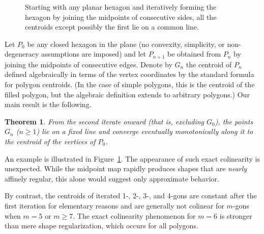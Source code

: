 \documentclass{amsart}
\newtheorem{theorem}{Theorem}
\theoremstyle{definition}
\begin{document}
\begin{figure}[ht]
    \caption{Starting with any planar hexagon and iteratively forming the hexagon by joining the midpoints of consecutive sides, all the centroids except possibly the first lie on a common line.}
    \label{fig:example}
\end{figure}

Let $P_0$ be any closed hexagon in the plane (no convexity, simplicity, or non-degeneracy assumptions are imposed) and let $P_{n+1}$ be obtained from $P_n$ by joining the midpoints of consecutive edges. Denote by $G_n$ the centroid of $P_n$ defined algebraically in terms of the vertex coordinates by the standard formula for polygon centroids. (In the case of simple polygons, this is the centroid of the filled polygon, but the algebraic definition extends to arbitrary polygons.) Our main result is the following.

\begin{theorem}
    From the second iterate onward (that is, excluding $G_0$), the points $G_n$ ($n\ge 1$) lie on a fixed line and converge eventually monotonically along it to the centroid of the vertices of $P_0$.
    \label{thm:centroid_colinearity}
\end{theorem}

An example is illustrated in Figure~\ref{fig:example}. The appearance of such exact colinearity is unexpected. While the midpoint map rapidly produces shapes that are \emph{nearly} affinely regular, this alone would suggest only approximate behavior.

By contrast, the centroids of iterated 1-, 2-, 3-, and 4-gons are constant after the first iteration for elementary reasons and are generally not colinear for $m$-gons when $m=5$ or $m\ge 7$. The exact colinearity phenomenon for $m=6$ is stronger than mere shape regularization, which occurs for all polygons.
\end{document}
